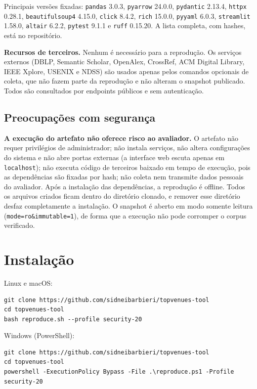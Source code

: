 \documentclass[12pt]{article}
\begin{document}
Principais versões fixadas: \texttt{pandas} 3.0.3, \texttt{pyarrow} 24.0.0,
\texttt{pydantic} 2.13.4, \texttt{httpx} 0.28.1, \texttt{beautifulsoup4} 4.15.0,
\texttt{click} 8.4.2, \texttt{rich} 15.0.0, \texttt{pyyaml} 6.0.3,
\texttt{streamlit} 1.58.0, \texttt{altair} 6.2.2, \texttt{pytest} 9.1.1 e
\texttt{ruff} 0.15.20. A lista completa, com hashes, está no repositório.

\textbf{Recursos de terceiros.} Nenhum é necessário para a reprodução. Os
serviços externos (DBLP, Semantic Scholar, OpenAlex, CrossRef, ACM Digital
Library, IEEE Xplore, USENIX e NDSS) são usados apenas pelos comandos opcionais
de coleta, que não fazem parte da reprodução e não alteram o snapshot publicado.
Todos são consultados por endpoints públicos e sem autenticação.

\subsection{Preocupações com segurança}

\textbf{A execução do artefato não oferece risco ao avaliador.} O artefato não
requer privilégios de administrador; não instala serviços, não altera
configurações do sistema e não abre portas externas (a interface web escuta
apenas em \texttt{localhost}); não executa código de terceiros baixado em tempo
de execução, pois as dependências são fixadas por hash; não coleta nem transmite
dados pessoais do avaliador. Após a instalação das dependências, a reprodução é
offline. Todos os arquivos criados ficam dentro do diretório clonado, e remover
esse diretório desfaz completamente a instalação. O snapshot é aberto em modo
somente leitura (\texttt{mode=ro\&immutable=1}), de forma que a execução não pode
corromper o corpus verificado.

\section{Instalação}

\noindent Linux e macOS:
\begin{verbatim}
git clone https://github.com/sidneibarbieri/topvenues-tool
cd topvenues-tool
bash reproduce.sh --profile security-20
\end{verbatim}

\noindent Windows (PowerShell):
\begin{verbatim}
git clone https://github.com/sidneibarbieri/topvenues-tool
cd topvenues-tool
powershell -ExecutionPolicy Bypass -File .\reproduce.ps1 -Profile security-20
\end{verbatim}
\end{document}
